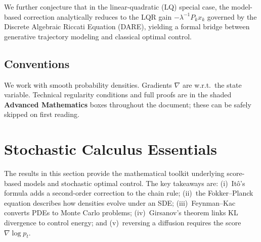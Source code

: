 \documentclass[11pt,letterpaper]{article}
\theoremstyle{plain}
\theoremstyle{definition}
\theoremstyle{remark}
\newcommand{\grad}{\nabla}
\begin{document}
We further conjecture that in the linear-quadratic (LQ) special case,
the model-based correction analytically reduces to the LQR gain
$-\lambda^{-1}P_k x_k$ governed by the Discrete Algebraic Riccati
Equation (DARE), yielding a formal bridge between generative trajectory
modeling and classical optimal control.

\subsection{Conventions}
We work with smooth probability densities. Gradients $\grad$ are
w.r.t.\ the state variable. Technical regularity conditions and full
proofs are in the shaded \textbf{Advanced Mathematics} boxes
throughout the document; these can be safely skipped on first reading.

\section{Stochastic Calculus Essentials}\label{sec:prelim}

The results in this section provide the mathematical toolkit
underlying score-based models and stochastic optimal control. The key
takeaways are: (i)~It\^o's formula adds a second-order correction to
the chain rule; (ii)~the Fokker--Planck equation describes how
densities evolve under an SDE; (iii)~Feynman--Kac converts PDEs to
Monte Carlo problems; (iv)~Girsanov's theorem links KL divergence to
control energy; and (v)~reversing a diffusion requires the score
$\grad\log p_t$.
\end{document}

